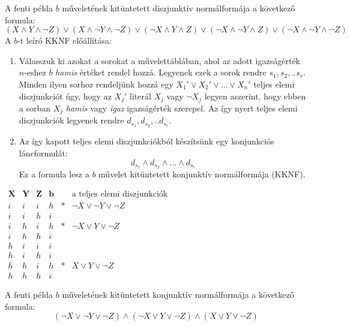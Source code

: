 \documentclass[tikz,12pt,margin=0px]{article}
\begin{document}
	\noindent A fenti példa $b$ műveletének kitüntetett diszjunktív normálformája a következő formula:
    \[
	   (X \wedge Y \wedge \neg Z) \vee (X \wedge \neg Y \wedge \neg Z) \vee (\neg X \wedge Y \wedge Z) \vee (\neg X \wedge \neg Y \wedge Z) \vee (\neg X \wedge \neg Y \wedge \neg Z)
    \]
\newpage	
	\noindent A $b$-t leíró KKNF előállítása:
	
	\begin{enumerate}
		\item	Válasszuk ki azokat a sorokat a művelettáblában, ahol az adott igazságérték $n$-eshez $b$ \textit{hamis}
		értéket rendel hozzá. Legyenek ezek a sorok rendre $s_{1}, s_{2}, .. s_{r}$. Minden ilyen sorhoz rendeljünk
		hozzá egy $X_{1}' \vee X_{2}' \vee \ldots \vee X_{n}'$ teljes elemi diszjunkciót úgy, hogy az $X_{j}'$ literál
		$X_{j}$ vagy $\neg X_{j}$ legyen aszerint, hogy ebben a sorban $X_{j}$ \textit{hamis} vagy \textit{igaz} igazságérték
		szerepel. Az így nyert teljes elemi diszjunkciók legyenek rendre $d_{s_{1}}, d_{s_{2}}, .. d_{s_{r}}$.
		
		\item	Az így kapott teljes elemi diszjunkciókból készítsünk egy konjunkciós láncformulát:
        \[
            d_{s_{1}} \wedge d_{s_{2}} \wedge \ldots \wedge d_{s_{r}}
        \]
        Ez a formula lesz a $b$ művelet kitüntetett konjunktív normálformája (KKNF).
	\end{enumerate}
	
	\begin{center}
      $\begin{array}{c|c|c||c|c|c}
        \textbf{X} & \textbf{Y} & \textbf{Z} & \textbf{b} &   & \text{a teljes elemi diszjunkciók} \\ \hline
        i & i & i & h & * & \neg X \vee \neg Y \vee \neg Z \\ \hline
        i & i & h & i &   & \\ \hline
        i & h & i & h & * & \neg X \vee Y \vee \neg Z \\ \hline
        i & h & h & i &   & \\ \hline
        h & i & i & i &   & \\ \hline
        h & i & h & i &   & \\ \hline
        h & h & i & h & * & X \vee Y \vee \neg Z \\ \hline
        h & h & h & i &   &
      \end{array}$
	\end{center}
	
	A fenti példa $b$ műveletének kitüntetett konjunktív normálformája a következő formula:
    \[
	   (\neg X \vee \neg Y \vee \neg Z) \wedge (\neg X \vee Y \vee \neg Z) \wedge (X \vee Y \vee \neg Z)
    \]
	
\end{document}
